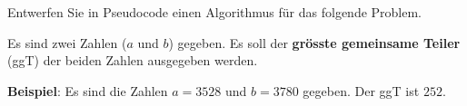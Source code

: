 %
%
Entwerfen Sie in Pseudocode einen Algorithmus für das folgende Problem.

\begin{problem}\label{problem-ggt-2-zahlen}
Es sind zwei Zahlen ($a$ und $b$) gegeben. Es soll der \textbf{grösste gemeinsame Teiler} (\acs{ggT}) der beiden Zahlen ausgegeben werden.
\end{problem}

\textbf{Beispiel}: Es sind die Zahlen $a = 3528$ und $b = 3780$ gegeben. Der \acs{ggT} ist $252$.

\fillwithgrid	{4in}
